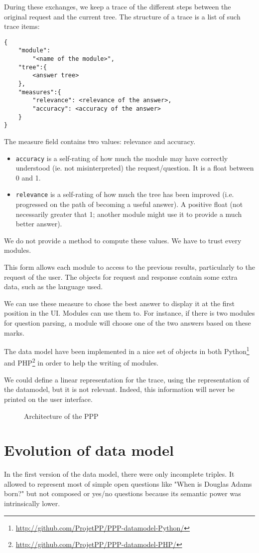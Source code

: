 During these exchanges, we keep a trace of the different steps between the original request and the current tree. The structure of a trace is a list of such trace items:
\begin{verbatim}
{
    "module":
        "<name of the module>", 
    "tree":{
        <answer tree>
    },
    "measures":{
        "relevance": <relevance of the answer>,
        "accuracy": <accuracy of the answer>
    }
}
\end{verbatim}

The measure field contains two values: relevance and accuracy.

\begin{itemize}
    \item \texttt{accuracy} is a self-rating of how much the module may have correctly understood (ie. not misinterpreted) the request/question. It is a float between 0 and 1.
    \item \texttt{relevance} is a self-rating of how much the tree has been improved (i.e. progressed on the path of becoming a useful answer). A positive float (not necessarily greater that 1; another module might use it to provide a much better answer).
\end{itemize}

We do not provide a method to compute these values. We have to trust every modules.

This form allows each module to access to the previous results, particularly to the request of the user. The objects for request and response contain some extra data, such as the language used.

We can use these measure to chose the best answer to display it at the first position in the UI. Modules can use them to. For instance, if there is two modules for question parsing, a module will choose one of the two answers based on these marks.

The data model have been implemented in a nice set of objects in both Python\footnote{\url{http://github.com/ProjetPP/PPP-datamodel-Python/}} and PHP\footnote{\url{http://github.com/ProjetPP/PPP-datamodel-PHP/}} in order to help the writing of modules.

We could define a linear representation for the trace, using the representation of the datamodel, but it is not relevant. Indeed, this information will never be printed on the user interface.

\begin{figure}[!ht]
    \centering
    \label{datamodel:struct}
    
    \caption{Architecture of the PPP}
\end{figure}

\section{Evolution of data model}

In the first version of the data model, there were only incomplete triples. It allowed to represent most of simple open questions like "When is Douglas Adams born?" but not composed or yes/no questions because its semantic power was intrinsically lower.
